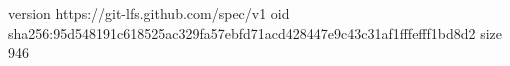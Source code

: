 version https://git-lfs.github.com/spec/v1
oid sha256:95d548191c618525ac329fa57ebfd71acd428447e9c43c31af1fffefff1bd8d2
size 946
